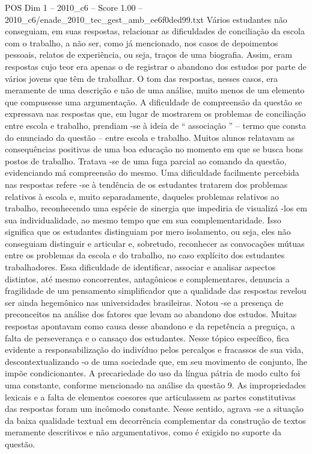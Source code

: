 \begin{textsample}{POS Dim 1 – 2010\_c6 – Score 1.00 – 2010\_c6/enade\_2010\_tec\_gest\_amb\_ee6f0ded99.txt}
Vários estudantes não conseguiam, em suas respostas, relacionar as dificuldades de conciliação da escola com o trabalho, a não ser, como já mencionado, nos casos de depoimentos pessoais, relatos de experiência, ou seja, traços de uma biografia.
Assim, eram respostas cujo teor era apenas o de registrar o abandono dos estudos por parte de vários jovens que têm de trabalhar.
O tom das respostas, nesses casos, era meramente de uma descrição e não de uma análise, muito menos de um elemento que compusesse uma argumentação.
A dificuldade de compreensão da questão se expressava nas respostas que, em lugar de mostrarem os problemas de conciliação entre escola e trabalho, prendiam -se à ideia de “ associação ” – termo que consta do enunciado da questão – entre escola e trabalho.
Muitos alunos relatavam as consequências positivas de uma boa educação no momento em que se busca bons postos de trabalho.
Tratava -se de uma fuga parcial ao comando da questão, evidenciando má compreensão do mesmo.
Uma dificuldade facilmente percebida nas respostas refere -se à tendência de os estudantes tratarem dos problemas relativos à escola e, muito separadamente, daqueles problemas relativos ao trabalho, reconhecendo uma espécie de sinergia que impediria de visualizá -los em sua individualidade, ao mesmo tempo que em sua complementaridade.
Isso significa que os estudantes distinguiam por mero isolamento, ou seja, eles não conseguiam distinguir e articular e, sobretudo, reconhecer as convocações mútuas entre os problemas da escola e do trabalho, no caso explícito dos estudantes trabalhadores.
Essa dificuldade de identificar, associar e analisar aspectos distintos, até mesmo concorrentes, antagônicos e complementares, denuncia a fragilidade de um pensamento simplificador que a qualidade das respostas revelou ser ainda hegemônico nas universidades brasileiras.
Notou -se a presença de preconceitos na análise dos fatores que levam ao abandono dos estudos.
Muitas respostas apontavam como causa desse abandono e da repetência a preguiça, a falta de perseverança e o cansaço dos estudantes.
Nesse tópico específico, fica evidente a responsabilização do indivíduo pelos percalços e fracassos de sua vida, descontextualizando -o de uma sociedade que, em seu movimento de conjunto, lhe impõe condicionantes.
A precariedade do uso da língua pátria de modo culto foi uma constante, conforme mencionado na análise da questão 9.
As impropriedades lexicais e a falta de elementos coesores que articulassem as partes constitutivas das respostas foram um incômodo constante.
Nesse sentido, agrava -se a situação da baixa qualidade textual em decorrência complementar da construção de textos meramente descritivos e não argumentativos, como é exigido no suporte da questão.

\end{textsample}
